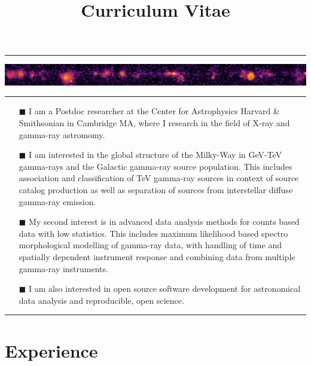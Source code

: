 \documentclass[11pt,a4paper,sans]{moderncv}        %
\title{Curriculum Vitae}                               %
\begin{document}
\makecvtitle

\centering\textcolor{color1}{\rule{\textwidth}{1pt}}
\vspace*{-11pt}\includegraphics[width=\textwidth]{galactic-plane}
\centering\textcolor{color1}{\rule{\textwidth}{1pt}}

\begin{multicols}{2}
\begin{itemize}
\item[\small\textcolor{color1}{$\blacksquare$}] I am a Postdoc researcher at the Center for Astrophysics Harvard \& Smithsonian in Cambridge MA, where I research in the field of X-ray and gamma-ray astromomy.
\item[\small\textcolor{color1}{$\blacksquare$}] I am interested in the global structure of the Milky-Way in GeV-TeV gamma-rays and the Galactic gamma-ray source population. This includes association and classification of TeV gamma-ray sources in context of source catalog production as well as separation of sources from interstellar diffuse gamma-ray emission.   
\item[\small\textcolor{color1}{$\blacksquare$}] My second interest is in advanced data analysis methods for counts based data with low statistics. This includes maximum likelihood based spectro morphological modelling of gamma-ray data, with handling of time and spatially dependent instrument response and combining data from multiple gamma-ray instruments. 
\item[\small\textcolor{color1}{$\blacksquare$}] I am also interested in open source software development for astronomical data analysis and reproducible, open science.
\end{itemize}
\end{multicols}

\centering\textcolor{color1}{\rule{\textwidth}{1pt}}

\section{\textbf{Experience}}
\end{document}
